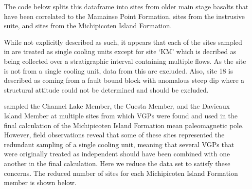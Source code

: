 \documentclass{article}
\begin{document}


    The code below splits this dataframe into sites from older main stage
basalts that have been correlated to the Mamainse Point Formation, sites
from the instrusive suite, and sites from the Michipicoten Island
Formation.

While not explicitly described as such, it appears that each of the
sites sampled in \cite{Palmer1987a} are treated as single cooling
units except for site `KM' which is decribed as being collected over a
stratigraphic interval containing multiple flows. As the site is not
from a single cooling unit, data from this are excluded. Also, site 18
is described as coming from a fault bound block with anomalous steep dip
where a structural attitude could not be determined and should be
excluded.

\cite{Palmer1987a} sampled the Channel Lake Member, the Cuesta
Member, and the Davieaux Island Member at multiple sites from which VGPs
were found and used in the final calculation of the Michipicoten Island
Formation mean paleomagnetic pole. However, field observations reveal
that some of these sites represented the redundant sampling of a single
cooling unit, meaning that several VGPs that were originally treated as
independent should have been combined with one another in the final
calculation. Here we reduce the \cite{Palmer1987a} data set to
satisfy these concerns. The reduced number of sites for each
Michipicoten Island Formation member is shown below.
\end{document}
